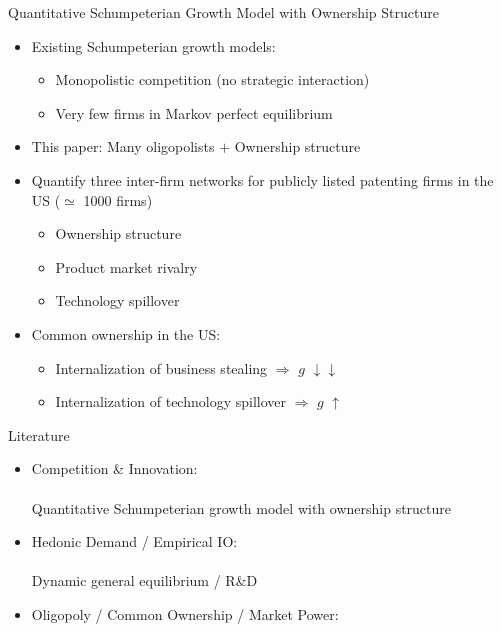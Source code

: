 \documentclass[
  10pt,               %
  aspectratio=169,    %
]{beamer}
\theoremstyle{plain}
\begin{document}
\begin{frame}{Quantitative Schumpeterian Growth Model with Ownership Structure}
  \begin{itemize}
    \item Existing Schumpeterian growth models:
    \begin{itemize}
      \item Monopolistic competition (no strategic interaction)
      \item Very few firms in Markov perfect equilibrium
    \end{itemize}
    \medskip{}
    \item This paper: Many oligopolists $+$ Ownership structure
    \medskip{}\pause
    \item Quantify three inter-firm networks for publicly listed patenting firms in the US ($\simeq$ 1000 firms)
    \begin{itemize}
      \item Ownership structure
      \item Product market rivalry
      \item Technology spillover
    \end{itemize}
    \medskip{}\pause
    \item Common ownership in the US:
    \begin{itemize}
      \item Internalization of business stealing $\Longrightarrow$ $g$ $\downarrow \downarrow$
      \item Internalization of technology spillover $\Longrightarrow$ $g$ $\uparrow$
    \end{itemize}
  \end{itemize}
\end{frame}

\begin{frame}{Literature}
  \begin{itemize}
    \item Competition \& Innovation: \\
          {\footnotesize\citet{d-Aspremont1988-je,Kamien1992-la,Aghion2001-yc,Aghion2005-vw,Acemoglu2012-bj,Aghion2013-nq,Bloom2013-pn,Lopez2019-sl,Peters2020-sd,Akcigit2021-ns,Akcigit2023-zl,Liu2022-iw,Cavenaile2023-lo,Anton2023-ej,Anton2024-pw,Kini2024-kd,Hopenhayn2024-ya}}\\
          \alert{Quantitative Schumpeterian growth model with ownership structure}\\
  \item Hedonic Demand / Empirical IO: \\
          {\footnotesize\citet{Lancaster1966-sg,Rosen1974-ep,Berry1995-lx,Nevo2001-ja,Pellegrino2024-dn,Ederer2024-rw}}\\
          \alert{Dynamic general equilibrium / R\&D}
    \item Oligopoly / Common Ownership / Market Power: \\
          {\footnotesize\citet{Rubinstein1983-pi,Rotemberg1984-jz,Neary2003-sn,Atkeson2008-zc,Gutierrez2017-wl,He2017-ix,Azar2018-cc,Azar2022-cn,Autor2020-mr,Baqaee2020-eb,De_Loecker2020-jn,Azar2021-uh,Edmond2023-bg}}
  \end{itemize}
\end{frame}
\end{document}
